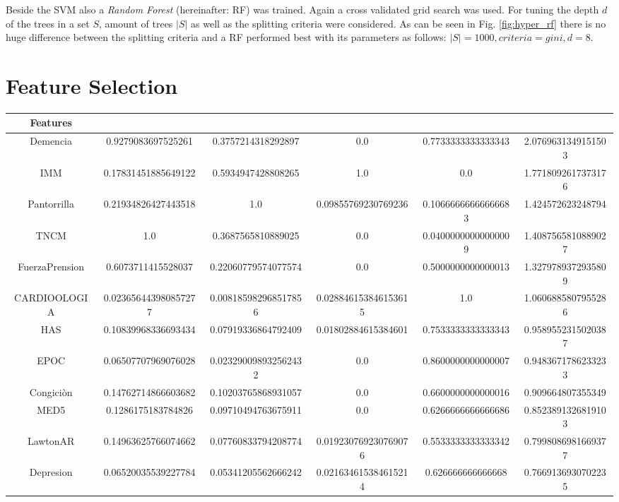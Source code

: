 \documentclass[11pt]{article}
\begin{document}
Beside the SVM also a \emph{Random Forest} (hereinafter: RF) was trained. Again a cross validated grid search was used. For tuning the depth $d$ of the trees in a set $S$, amount of trees $|S|$ as well as the splitting criteria were considered. As can be seen in Fig. \ref{fig:hyper_rf} there is no huge difference between the splitting criteria and a RF performed best with its parameters as follows: $|S|= 1000	, criteria = gini, d=8$.



\section{Feature Selection}
\begin{table}
\centering
\scriptsize
\begin{tabular}{|c|SSSSS|}
\hline
Features &  &  &  &  &  \\ \hline
Demencia & 0.9279083697525261 & 0.3757214318292897 & 0.0 & 0.7733333333333343 & 2.0769631349151503\\ 
IMM & 0.17831451885649122 & 0.5934947428808265 &1.0& 0.0 & 1.7718092617373176\\ 
Pantorrilla & 0.21934826427443518 & 1.0 & 0.09855769230769236 & 0.10666666666666683 & 1.424572623248794\\ 
TNCM& 1.0 & 0.3687565810889025 & 0.0 & 0.04000000000000009 & 1.4087565810889027\\ 
FuerzaPrension & 0.6073711415528037 & 0.22060779574077574 & 0.0 & 0.5000000000000013 & 1.3279789372935809\\
CARDIOOLOGIA & 0.023656443980857277 & 0.008185982968517856 & 0.028846153846153615 & 1.0 & 1.0606885807955286\\
HAS & 0.10839968336693434 & 0.07919336864792409 & 0.01802884615384601 & 0.7533333333333343 & 0.9589552315020387\\
EPOC &0.06507707969076028  & 0.023290098932562432 & 0.0 & 0.8600000000000007 & 0.9483671786233233\\
Congiciòn & 0.14762714866603682 & 0.10203765868931057 & 0.0 & 0.6600000000000016 &  0.909664807355349\\ 
MED5 & 0.1286175183784826 & 0.09710494763675911 & 0.0 & 0.6266666666666686 & 0.8523891326819103\\ 
LawtonAR & 0.14963625766074662 & 0.07760833794208774 & 0.019230769230769076 & 0.5533333333333342 & 0.7998086981669377\\ 
Depresion & 0.06520035539227784 & 0.05341205562666242 & 0.021634615384615214 & 0.626666666666668 & 0.7669136930702235\\

\end{tabular}
\end{table}
\end{document}
